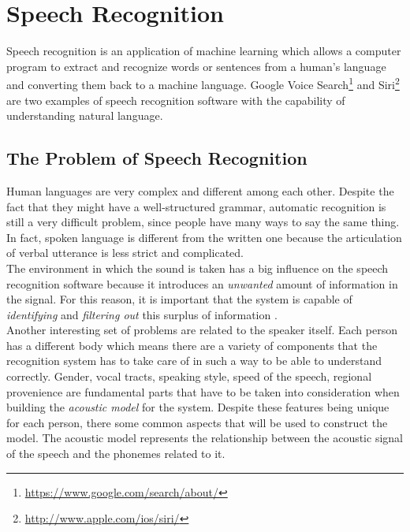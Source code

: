 
\chapter{Speech Recognition}
\label{chap:Speech Recognition}
Speech recognition is an application of machine learning which allows a computer program to extract and recognize words or sentences from a human's language and converting them back to a machine language. Google Voice Search\footnote{\url{https://www.google.com/search/about/}} and Siri\footnote{\url{http://www.apple.com/ios/siri/}} are two examples of speech recognition software with the capability of understanding natural language.

\section{The Problem of Speech Recognition}
\label{sec:The Problem of Speech Recognition}
Human languages are very complex and different among each other.  Despite the fact that they might have a well-structured grammar, automatic recognition is still a very difficult problem, since people have many ways to say the same thing. In fact, spoken language is different from the written one because the articulation of verbal utterance is less strict and complicated. \\
The environment in which the sound is taken has a big influence on the speech recognition software because it introduces an \textit{unwanted} amount of information in the signal. For this reason, it is important that the system is capable of \textit{identifying} and \textit{filtering out} this surplus of information \cite{forsberg2003speech}. \\

\noindent Another interesting set of problems are related to the speaker itself. Each person has a different body which means there are a variety of components that the recognition system has to take care of in such a way to be able to understand correctly. Gender, vocal tracts, speaking style, speed of the speech, regional provenience are fundamental parts that have to be taken into consideration when building the \textit{acoustic model} for the system. Despite these features being unique for each person, there some common aspects that will be used to construct the model. The acoustic model represents the relationship between the acoustic signal of the speech and the phonemes related to it. \\

